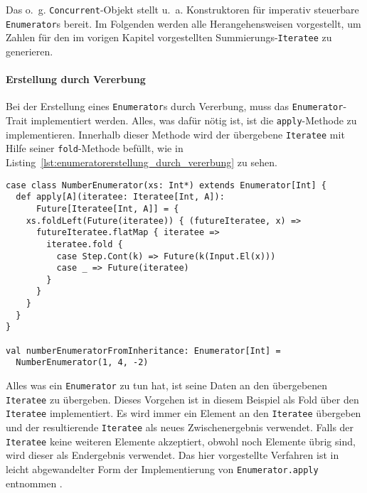 Das o.~g. \lstinline|Concurrent|-Objekt stellt u.~a. Konstruktoren für imperativ steuerbare \lstinline|Enumerator|s bereit.
Im Folgenden werden alle Herangehensweisen vorgestellt, um Zahlen für den im vorigen Kapitel vorgestellten Summierungs-\lstinline|Iteratee| zu generieren.

\paragraph{Erstellung durch Vererbung} %
\label{par:enumeratorerstellung_durch_vererbung}\mbox{} %

Bei der Erstellung eines \lstinline|Enumerator|s durch Vererbung, muss das \lstinline|Enumerator|-Trait implementiert werden.
Alles, was dafür nötig ist, ist die \lstinline|apply|-Methode zu implementieren.
Innerhalb dieser Methode wird der übergebene \lstinline|Iteratee| mit Hilfe seiner \lstinline|fold|-Methode befüllt, wie in Listing~\ref{lst:enumeratorerstellung_durch_vererbung} zu sehen.

\begin{lstlisting}[caption=Erstellung eines Enumerators durch Vererbung, label=lst:enumeratorerstellung_durch_vererbung]
case class NumberEnumerator(xs: Int*) extends Enumerator[Int] {
  def apply[A](iteratee: Iteratee[Int, A]):
      Future[Iteratee[Int, A]] = {
    xs.foldLeft(Future(iteratee)) { (futureIteratee, x) =>
      futureIteratee.flatMap { iteratee =>
        iteratee.fold {
          case Step.Cont(k) => Future(k(Input.El(x)))
          case _ => Future(iteratee)
        }
      }
    }
  }
}

val numberEnumeratorFromInheritance: Enumerator[Int] =
  NumberEnumerator(1, 4, -2)
\end{lstlisting}

Alles was ein \lstinline|Enumerator| zu tun hat, ist seine Daten an den übergebenen \lstinline|Iteratee| zu übergeben.
Dieses Vorgehen ist in diesem Beispiel als Fold über den \lstinline|Iteratee| implementiert.
Es wird immer ein Element an den \lstinline|Iteratee| übergeben und der resultierende \lstinline|Iteratee| als neues Zwischenergebnis verwendet.
Falls der \lstinline|Iteratee| keine weiteren Elemente akzeptiert, obwohl noch Elemente übrig sind, wird dieser als Endergebnis verwendet.
Das hier vorgestellte Verfahren ist in leicht abgewandelter Form der Implementierung von \lstinline|Enumerator.apply| entnommen \cite[vgl.][Z.~663 und Z.~690]{play_enumerator_source_code}.


